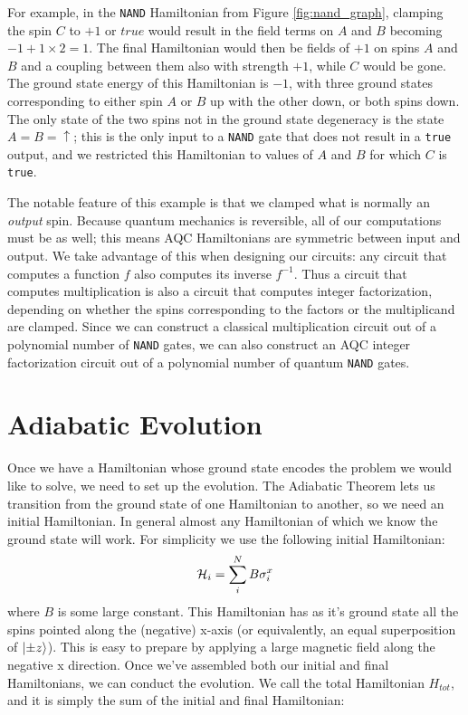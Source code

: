 For example, in the \texttt{NAND} Hamiltonian from Figure \ref{fig:nand_graph}, clamping the spin $C$ to $+1$ or $true$  would result in the field terms on $A$ and $B$ becoming $-1 + 1\times2 = 1$.  The final Hamiltonian would then be fields of $+1$ on spins $A$ and $B$ and a coupling between them also with strength $+1$, while $C$ would be gone.  The ground state energy of this Hamiltonian is $-1$, with three ground states corresponding to either spin $A$ or $B$ up with the other down, or both spins down.  The only state of the two spins not in the ground state degeneracy is the state $A = B = \uparrow$; this is the only input to a \texttt{NAND} gate that does not result in a \texttt{true} output, and we restricted this Hamiltonian to values of $A$ and $B$ for which $C$ is \texttt{true}.

The notable feature of this example is that we clamped what is normally an \emph{output} spin.  Because quantum mechanics is reversible, all of our computations must be as well; this means AQC Hamiltonians are symmetric between input and output.  We take advantage of this when designing our circuits: any circuit that computes a function $f$ also computes its inverse $f^{-1}$.  Thus a circuit that computes multiplication is also a circuit that computes integer factorization, depending on whether the spins corresponding to the factors or the multiplicand are clamped.  Since we can construct a classical multiplication circuit out of a polynomial number of \texttt{NAND} gates, we can also construct an AQC integer factorization circuit out of a polynomial number of quantum \texttt{NAND} gates.

\section{Adiabatic Evolution}
Once we have a Hamiltonian whose ground state encodes the problem we would like to solve, we need to set up the evolution.  The Adiabatic Theorem lets us transition from the ground state of one Hamiltonian to another, so we need an initial Hamiltonian.  In general almost any Hamiltonian of which we know the ground state will work.  For simplicity we use the following initial Hamiltonian:
\begin{equation}
	\mathcal{H}_i = \sum_i^N B \sigma_i^x
\end{equation}
where $B$ is some large constant.  This Hamiltonian has as it's ground state all the spins pointed along the (negative) x-axis (or equivalently, an equal superposition of $\mathinner{|{\pm z}\rangle}$).  This is easy to prepare by applying a large magnetic field along the negative x direction.
Once we've assembled both our initial and final Hamiltonians, we can conduct the evolution.  We call the total Hamiltonian $H_{tot}$, and it is simply the sum of the initial and final Hamiltonian:

